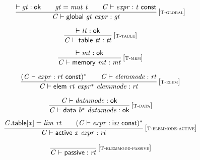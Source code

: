 $$
\begin{array}{@{}c@{}}\displaystyle
\frac{
{ \vdash }\;{\mathit{gt}} : \mathsf{ok}
 \qquad
{\mathit{gt}} = {\mathit{mut}}~{\mathit{t}}
 \qquad
{\mathit{C}} \vdash {\mathit{expr}} : {\mathit{t}}~\mathsf{const}
}{
{\mathit{C}} \vdash \mathsf{global}~{\mathit{gt}}~{\mathit{expr}} : {\mathit{gt}}
} \, {[\textsc{\scriptsize T{-}global}]}
\qquad
\end{array}
$$

$$
\begin{array}{@{}c@{}}\displaystyle
\frac{
{ \vdash }\;{\mathit{tt}} : \mathsf{ok}
}{
{\mathit{C}} \vdash \mathsf{table}~{\mathit{tt}} : {\mathit{tt}}
} \, {[\textsc{\scriptsize T{-}table}]}
\qquad
\end{array}
$$

$$
\begin{array}{@{}c@{}}\displaystyle
\frac{
{ \vdash }\;{\mathit{mt}} : \mathsf{ok}
}{
{\mathit{C}} \vdash \mathsf{memory}~{\mathit{mt}} : {\mathit{mt}}
} \, {[\textsc{\scriptsize T{-}mem}]}
\qquad
\end{array}
$$

$$
\begin{array}{@{}c@{}}\displaystyle
\frac{
({\mathit{C}} \vdash {\mathit{expr}} : {\mathit{rt}}~\mathsf{const})^\ast
 \qquad
{\mathit{C}} \vdash {\mathit{elemmode}} : {\mathit{rt}}
}{
{\mathit{C}} \vdash \mathsf{elem}~{\mathit{rt}}~{{\mathit{expr}}^\ast}~{\mathit{elemmode}} : {\mathit{rt}}
} \, {[\textsc{\scriptsize T{-}elem}]}
\qquad
\end{array}
$$

$$
\begin{array}{@{}c@{}}\displaystyle
\frac{
{\mathit{C}} \vdash {\mathit{datamode}} : \mathsf{ok}
}{
{\mathit{C}} \vdash \mathsf{data}~{{\mathit{b}}^\ast}~{\mathit{datamode}} : \mathsf{ok}
} \, {[\textsc{\scriptsize T{-}data}]}
\qquad
\end{array}
$$

$$
\begin{array}{@{}c@{}}\displaystyle
\frac{
{\mathit{C}}.\mathsf{table}{}[{\mathit{x}}] = {\mathit{lim}}~{\mathit{rt}}
 \qquad
({\mathit{C}} \vdash {\mathit{expr}} : \mathsf{i{\scriptstyle32}}~\mathsf{const})^\ast
}{
{\mathit{C}} \vdash \mathsf{active}~{\mathit{x}}~{\mathit{expr}} : {\mathit{rt}}
} \, {[\textsc{\scriptsize T{-}elemmode{-}active}]}
\qquad
\end{array}
$$

$$
\begin{array}{@{}c@{}}\displaystyle
\frac{
}{
{\mathit{C}} \vdash \mathsf{passive} : {\mathit{rt}}
} \, {[\textsc{\scriptsize T{-}elemmode{-}passive}]}
\qquad
\end{array}
$$

